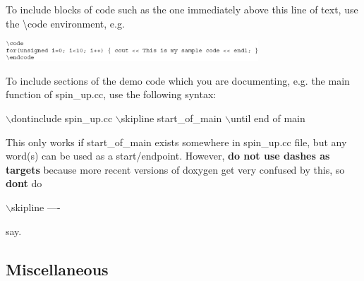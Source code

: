 To include blocks of code such as the one immediately above this line of text, use the {\ttfamily \textbackslash{}code} environment, e.\+g.

 
\begin{DoxyImageNoCaption}
  \mbox{\includegraphics[width=0.71\textwidth]{code_environment}}
\end{DoxyImageNoCaption}


To include sections of the demo code which you are documenting, e.\+g. the main function of {\ttfamily spin\+\_\+up}.{\ttfamily cc}, use the following syntax\+: 
\begin{DoxyCode}
\(\backslash\)dontinclude spin\_up.cc
\(\backslash\)skipline start\_of\_main
\(\backslash\)until end of main
\end{DoxyCode}
 This only works if {\ttfamily start\+\_\+of\+\_\+main} exists somewhere in {\ttfamily spin\+\_\+up}.{\ttfamily cc} file, but any word(s) can be used as a start/endpoint. However, {\bfseries do not use dashes as targets} because more recent versions of doxygen get very confused by this, so {\bfseries don\textquotesingle{}t} do 
\begin{DoxyCode}
\(\backslash\)skipline ----
\end{DoxyCode}
 say.\hypertarget{index_misc}{}\subsection{Miscellaneous}\label{index_misc}

